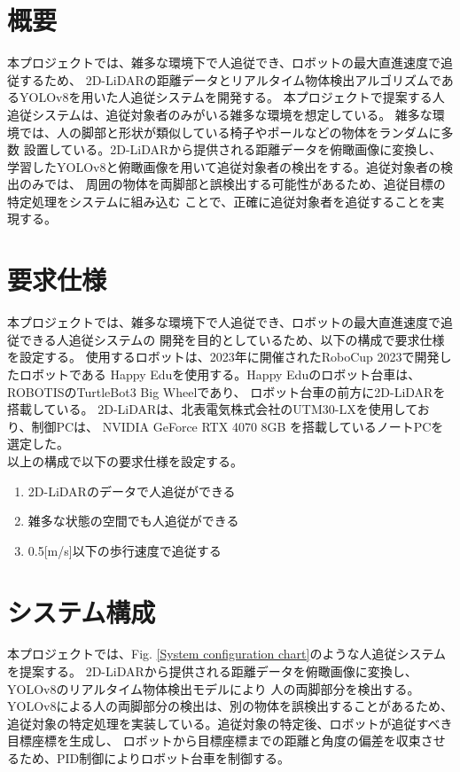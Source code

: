\section{概要}
本プロジェクトでは、雑多な環境下で人追従でき、ロボットの最大直進速度で追従するため、
2D-LiDARの距離データとリアルタイム物体検出アルゴリズムであるYOLOv8を用いた人追従システムを開発する。
本プロジェクトで提案する人追従システムは、追従対象者のみがいる雑多な環境を想定している。
雑多な環境では、人の脚部と形状が類似している椅子やポールなどの物体をランダムに多数
設置している。2D-LiDARから提供される距離データを俯瞰画像に変換し、
学習したYOLOv8と俯瞰画像を用いて追従対象者の検出をする。追従対象者の検出のみでは、
周囲の物体を両脚部と誤検出する可能性があるため、追従目標の特定処理をシステムに組み込む
ことで、正確に追従対象者を追従することを実現する。

\section{要求仕様}
本プロジェクトでは、雑多な環境下で人追従でき、ロボットの最大直進速度で追従できる人追従システムの
開発を目的としているため、以下の構成で要求仕様を設定する。
使用するロボットは、2023年に開催されたRoboCup 2023で開発したロボットである
Happy Eduを使用する。Happy Eduのロボット台車は、ROBOTISのTurtleBot3 Big Wheelであり、
ロボット台車の前方に2D-LiDARを搭載している。
2D-LiDARは、北表電気株式会社のUTM30-LXを使用しており、制御PCは、
NVIDIA GeForce RTX 4070 8GB を搭載しているノートPCを選定した。\\ \indent
以上の構成で以下の要求仕様を設定する。\\

\begin{enumerate}
\item 2D-LiDARのデータで人追従ができる \\
\item 雑多な状態の空間でも人追従ができる \\
\item 0.5[m/s]以下の歩行速度で追従する \\
\end{enumerate}

\section{システム構成}
本プロジェクトでは、Fig. \ref{System configuration chart}のような人追従システムを提案する。
2D-LiDARから提供される距離データを俯瞰画像に変換し、YOLOv8のリアルタイム物体検出モデルにより
人の両脚部分を検出する。YOLOv8による人の両脚部分の検出は、別の物体を誤検出することがあるため、
追従対象の特定処理を実装している。追従対象の特定後、ロボットが追従すべき目標座標を生成し、
ロボットから目標座標までの距離と角度の偏差を収束させるため、PID制御によりロボット台車を制御する。

